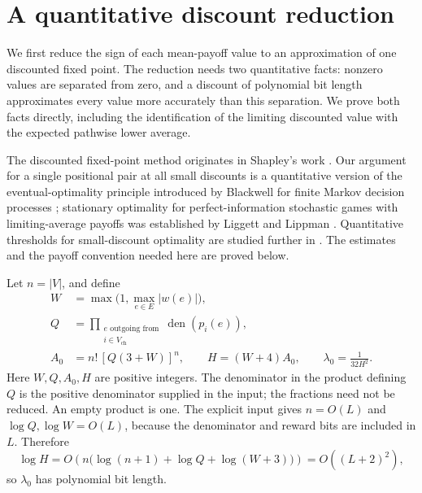 \section{A quantitative discount reduction}
\label{sec:discount}

We first reduce the sign of each mean-payoff value to an approximation of
one discounted fixed point. The reduction needs two quantitative facts:
nonzero values are separated from zero, and a discount of polynomial bit
length approximates every value more accurately than this separation.
We prove both facts directly, including the identification of the limiting
discounted value with the expected pathwise lower average.

The discounted fixed-point method originates in Shapley's work
\cite{Shapley1953}. Our argument for a single positional pair at all small
discounts is a quantitative version of the eventual-optimality principle
introduced by Blackwell for finite Markov decision processes
\cite{Blackwell1962}; stationary optimality for perfect-information
stochastic games with limiting-average payoffs was established by Liggett
and Lippman \cite{LiggettLippman1969}. Quantitative thresholds for
small-discount optimality are studied further in
\cite{GaubertGrandClementKatz2025}. The estimates and the payoff
convention needed here are proved below.

Let $n=|V|$, and define
\begin{equation}
\begin{split}
 W&=\max\bigl(1,\max_{e\in E}|w(e)|\bigr),\\
 Q&=\prod_{\substack{e\text{ outgoing from}\\i\in V_{\mathrm{ch}}}}
       \operatorname{den}(p_i(e)),\\
 A_0&=n!\,[Q(3+W)]^n,
 \qquad H=(W+4)A_0,
 \qquad \lambda_0=\frac1{32H^2}.
\end{split}
\label{eq:discount-parameters}
\end{equation}
Here $W,Q,A_0,H$ are positive integers. The denominator in the product
defining $Q$ is the positive denominator supplied in the input; the
fractions need not be reduced. An empty product is one.
The explicit input gives $n=O(L)$ and $\log Q,\log W=O(L)$, because
the denominator and reward bits are included in $L$. Therefore
\[
 \log H=O\!\left(n\bigl(\log(n+1)+\log Q+\log(W+3)\bigr)\right)
        =O((L+2)^2),
\]
so $\lambda_0$ has polynomial bit length.

